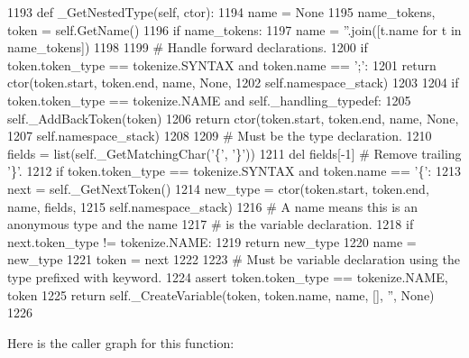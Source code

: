 \begin{DoxyCode}
1193     \textcolor{keyword}{def }\_GetNestedType(self, ctor):
1194         name = \textcolor{keywordtype}{None}
1195         name\_tokens, token = self.GetName()
1196         \textcolor{keywordflow}{if} name\_tokens:
1197             name = \textcolor{stringliteral}{''}.join([t.name \textcolor{keywordflow}{for} t \textcolor{keywordflow}{in} name\_tokens])
1198 
1199         \textcolor{comment}{# Handle forward declarations.}
1200         \textcolor{keywordflow}{if} token.token\_type == tokenize.SYNTAX \textcolor{keywordflow}{and} token.name == \textcolor{stringliteral}{';'}:
1201             \textcolor{keywordflow}{return} ctor(token.start, token.end, name, \textcolor{keywordtype}{None},
1202                         self.namespace\_stack)
1203 
1204         \textcolor{keywordflow}{if} token.token\_type == tokenize.NAME \textcolor{keywordflow}{and} self.\_handling\_typedef:
1205             self.\_AddBackToken(token)
1206             \textcolor{keywordflow}{return} ctor(token.start, token.end, name, \textcolor{keywordtype}{None},
1207                         self.namespace\_stack)
1208 
1209         \textcolor{comment}{# Must be the type declaration.}
1210         fields = list(self.\_GetMatchingChar(\textcolor{stringliteral}{'\{'}, \textcolor{stringliteral}{'\}'}))
1211         del fields[-1]                  \textcolor{comment}{# Remove trailing '\}'.}
1212         \textcolor{keywordflow}{if} token.token\_type == tokenize.SYNTAX \textcolor{keywordflow}{and} token.name == \textcolor{stringliteral}{'\{'}:
1213             next = self.\_GetNextToken()
1214             new\_type = ctor(token.start, token.end, name, fields,
1215                             self.namespace\_stack)
1216             \textcolor{comment}{# A name means this is an anonymous type and the name}
1217             \textcolor{comment}{# is the variable declaration.}
1218             \textcolor{keywordflow}{if} next.token\_type != tokenize.NAME:
1219                 \textcolor{keywordflow}{return} new\_type
1220             name = new\_type
1221             token = next
1222 
1223         \textcolor{comment}{# Must be variable declaration using the type prefixed with keyword.}
1224         \textcolor{keyword}{assert} token.token\_type == tokenize.NAME, token
1225         \textcolor{keywordflow}{return} self.\_CreateVariable(token, token.name, name, [], \textcolor{stringliteral}{''}, \textcolor{keywordtype}{None})
1226 
\end{DoxyCode}
Here is the caller graph for this function\+:
\nopagebreak
